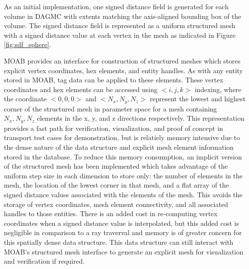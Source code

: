 As an initial implementation, one signed distance field is generated for each
volume in DAGMC with extents matching the axis-aligned bounding box of the
volume. The signed distance field is represented as a uniform structured mesh
with a signed distance value at each vertex in the mesh as indicated in Figure
\ref{fig:sdf_sphere}.

MOAB provides an interface for construction of structured meshes which stores
explicit vertex coordinates, hex elements, and entity handles. As with any
entity stored in MOAB, tag data can be applied to these elements. These vertex
coordinates and hex elements can be accessed using $<i,j,k>$ indexing, where the
coordinate $<0,0,0>$ and $<N_{x}, N_{y}, N_{z}>$ represent the lowest and
highest corner of the structured mesh in parameter space for a mesh containing
$N_{x},N_{y},N_{z}$ elements in the x, y, and z directions respectively. This
representation provides a fast path for verification, visualization, and proof
of concept in transport test cases for demonstration, but is relatiely memory
intensive due to the dense nature of the data structure and explicit mesh
element information stored in the database. To reduce this memory consumption,
an implicit version of the structured mesh has been implemented which takes
advantage of the uniform step size in each dimension to store only: the number
of elements in the mesh, the location of the lowest corner in that mesh, and a
flat array of the signed distance values associated with the elements of the
mesh.
This avoids the storage of vertex coordinates, mesh element connectivity, and
all associated handles to those entities. There is an added cost in re-computing
vertex coordinates when a signed distance value is interpolated, but this added
cost is negligible in comparison to a ray traverval and memory is of greater
concern for this spatially dense data structure. This data structure can still
interact with MOAB's structured mesh interface to generate an explicit mesh for
visualization and verification if required.



